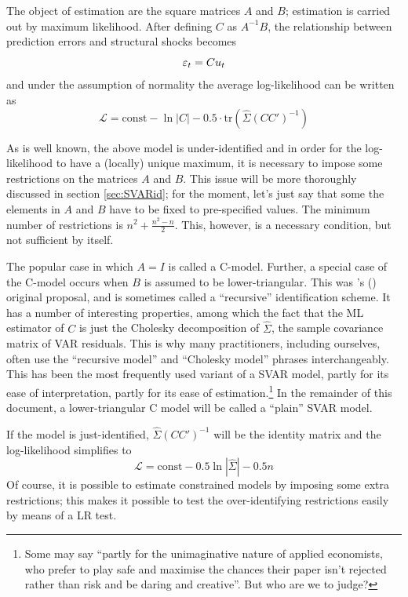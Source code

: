 \documentclass[a4paper,10pt]{article}
\newcommand{\PrE}[1]{\ensuremath \varepsilon_{#1}}
\newcommand{\StS}[1]{\ensuremath u_{#1}}
\begin{document}
The object of estimation are the square matrices $A$ and $B$;
estimation is carried out by maximum likelihood. After defining $C$ as
$A^{-1}B$, the relationship between prediction errors and structural
shocks becomes
\begin{equation}
  \label{eq:PrE-StS-C}
  \PrE{t} = C \StS{t}
\end{equation}
and under the assumption of normality the average log-likelihood can
be written as
\[
  \mathcal{L} = \mathrm{const} - \ln |C| - 0.5 \cdot
  \mathrm{tr}(\hat{\Sigma} (CC')^{-1}) 
\]

As is well known, the above model is under-identified and in order for
the log-likelihood to have a (locally) unique maximum, it is necessary
to impose some restrictions on the matrices $A$ and $B$. This issue
will be more thoroughly discussed in section \ref{sec:SVARid}; for the
moment, let's just say that some the elements in $A$ and $B$ have to
be fixed to pre-specified values. The minimum number of restrictions
is $n^2 + \frac{n^2 - n}{2}$. This, however, is a necessary condition,
but not sufficient by itself.

The popular case in which $A=I$ is called a C-model. Further, a
special case of the C-model occurs when $B$ is assumed to be
lower-triangular. This was \citeauthor{sims80}'s (\citeyear{sims80})
original proposal, and is sometimes called a ``recursive''
identification scheme. It has a number of interesting properties,
among which the fact that the ML estimator of $C$ is just the Cholesky
decomposition of $\hat{\Sigma}$, the sample covariance matrix of VAR
residuals. This is why many practitioners, including ourselves, often
use the ``recursive model'' and ``Cholesky model'' phrases
interchangeably.  This has been the most frequently used variant of a
SVAR model, partly for its ease of interpretation, partly for its ease
of estimation.\footnote{Some may say ``partly for the unimaginative
  nature of applied economists, who prefer to play safe and maximise
  the chances their paper isn't rejected rather than risk and be
  daring and creative''. But who are we to judge?} In the remainder of
this document, a lower-triangular C model will be called a ``plain''
SVAR model.

If the model is just-identified, $\hat{\Sigma} (CC')^{-1}$ will be the
identity matrix and the log-likelihood simplifies to
\[
  \mathcal{L} = \mathrm{const} - 0.5 \ln |\hat{\Sigma}| - 0.5 n
\]
Of course, it is possible to estimate constrained models by imposing
some extra restrictions; this makes it possible to test the
over-identifying restrictions easily by means of a LR test.
\end{document}

